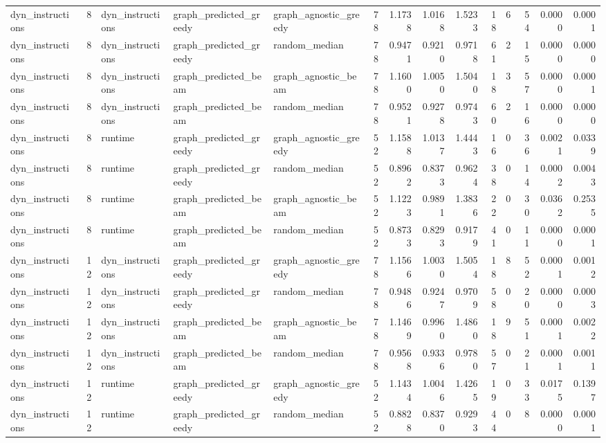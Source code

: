 \begin{table}[t]
\begin{tabular}{lrlllrrrrrrrrr}
dyn\_instructions & 8 & dyn\_instructions & graph\_predicted\_greedy & graph\_agnostic\_greedy & 78 & 1.1738 & 1.0168 & 1.5233 & 18 & 6 & 54 & 0.0000 & 0.0001 \\
dyn\_instructions & 8 & dyn\_instructions & graph\_predicted\_greedy & random\_median & 78 & 0.9471 & 0.9210 & 0.9718 & 61 & 2 & 15 & 0.0000 & 0.0000 \\
dyn\_instructions & 8 & dyn\_instructions & graph\_predicted\_beam & graph\_agnostic\_beam & 78 & 1.1600 & 1.0050 & 1.5040 & 18 & 3 & 57 & 0.0000 & 0.0001 \\
dyn\_instructions & 8 & dyn\_instructions & graph\_predicted\_beam & random\_median & 78 & 0.9521 & 0.9278 & 0.9743 & 60 & 2 & 16 & 0.0000 & 0.0000 \\
dyn\_instructions & 8 & runtime & graph\_predicted\_greedy & graph\_agnostic\_greedy & 52 & 1.1588 & 1.0137 & 1.4443 & 16 & 0 & 36 & 0.0021 & 0.0339 \\
dyn\_instructions & 8 & runtime & graph\_predicted\_greedy & random\_median & 52 & 0.8962 & 0.8373 & 0.9624 & 38 & 0 & 14 & 0.0002 & 0.0043 \\
dyn\_instructions & 8 & runtime & graph\_predicted\_beam & graph\_agnostic\_beam & 52 & 1.1223 & 0.9891 & 1.3836 & 22 & 0 & 30 & 0.0362 & 0.2535 \\
dyn\_instructions & 8 & runtime & graph\_predicted\_beam & random\_median & 52 & 0.8733 & 0.8293 & 0.9179 & 41 & 0 & 11 & 0.0000 & 0.0001 \\
dyn\_instructions & 12 & dyn\_instructions & graph\_predicted\_greedy & graph\_agnostic\_greedy & 78 & 1.1566 & 1.0030 & 1.5054 & 18 & 8 & 52 & 0.0001 & 0.0012 \\
dyn\_instructions & 12 & dyn\_instructions & graph\_predicted\_greedy & random\_median & 78 & 0.9486 & 0.9247 & 0.9709 & 58 & 0 & 20 & 0.0000 & 0.0003 \\
dyn\_instructions & 12 & dyn\_instructions & graph\_predicted\_beam & graph\_agnostic\_beam & 78 & 1.1469 & 0.9960 & 1.4860 & 18 & 9 & 51 & 0.0001 & 0.0022 \\
dyn\_instructions & 12 & dyn\_instructions & graph\_predicted\_beam & random\_median & 78 & 0.9568 & 0.9336 & 0.9780 & 57 & 0 & 21 & 0.0001 & 0.0011 \\
dyn\_instructions & 12 & runtime & graph\_predicted\_greedy & graph\_agnostic\_greedy & 52 & 1.1434 & 1.0046 & 1.4265 & 19 & 0 & 33 & 0.0175 & 0.1397 \\
dyn\_instructions & 12 & runtime & graph\_predicted\_greedy & random\_median & 52 & 0.8828 & 0.8370 & 0.9293 & 44 & 0 & 8 & 0.0000 & 0.0001 \\

\end{tabular}
\end{table}
